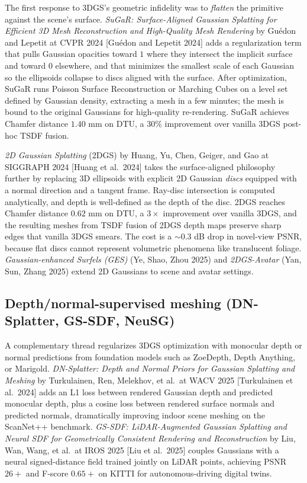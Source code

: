 The first response to 3DGS's geometric infidelity was to \emph{flatten} the primitive against the scene's surface. \emph{SuGaR: Surface-Aligned Gaussian Splatting for Efficient 3D Mesh Reconstruction and High-Quality Mesh Rendering} by Guédon and Lepetit at CVPR 2024 {[}Guédon and Lepetit 2024{]} adds a regularization term that pulls Gaussian opacities toward \(1\) where they intersect the implicit surface and toward \(0\) elsewhere, and that minimizes the smallest scale of each Gaussian so the ellipsoids collapse to discs aligned with the surface. After optimization, SuGaR runs Poisson Surface Reconstruction or Marching Cubes on a level set defined by Gaussian density, extracting a mesh in a few minutes; the mesh is bound to the original Gaussians for high-quality re-rendering. SuGaR achieves Chamfer distance \(1.40\) mm on DTU, a \(30\)\% improvement over vanilla 3DGS post-hoc TSDF fusion.

\emph{2D Gaussian Splatting} (2DGS) by Huang, Yu, Chen, Geiger, and Gao at SIGGRAPH 2024 {[}Huang et al.~2024{]} takes the surface-aligned philosophy further by replacing 3D ellipsoids with explicit 2D Gaussian \emph{discs} equipped with a normal direction and a tangent frame. Ray-disc intersection is computed analytically, and depth is well-defined as the depth of the disc. 2DGS reaches Chamfer distance \(0.62\) mm on DTU, a \(3\times\) improvement over vanilla 3DGS, and the resulting meshes from TSDF fusion of 2DGS depth maps preserve sharp edges that vanilla 3DGS smears. The cost is a \(\sim0.3\) dB drop in novel-view PSNR, because flat discs cannot represent volumetric phenomena like translucent foliage. \emph{Gaussian-enhanced Surfels (GES)} (Ye, Shao, Zhou 2025) and \emph{2DGS-Avatar} (Yan, Sun, Zhang 2025) extend 2D Gaussians to scene and avatar settings.

\subsection{Depth/normal-supervised meshing (DN-Splatter, GS-SDF, NeuSG)}\label{depthnormal-supervised-meshing-dn-splatter-gs-sdf-neusg}

A complementary thread regularizes 3DGS optimization with monocular depth or normal predictions from foundation models such as ZoeDepth, Depth Anything, or Marigold. \emph{DN-Splatter: Depth and Normal Priors for Gaussian Splatting and Meshing} by Turkulainen, Ren, Melekhov, et al.~at WACV 2025 {[}Turkulainen et al.~2024{]} adds an L1 loss between rendered Gaussian depth and predicted monocular depth, plus a cosine loss between rendered surface normals and predicted normals, dramatically improving indoor scene meshing on the ScanNet++ benchmark. \emph{GS-SDF: LiDAR-Augmented Gaussian Splatting and Neural SDF for Geometrically Consistent Rendering and Reconstruction} by Liu, Wan, Wang, et al.~at IROS 2025 {[}Liu et al.~2025{]} couples Gaussians with a neural signed-distance field trained jointly on LiDAR points, achieving PSNR \(26+\) and F-score \(0.65+\) on KITTI for autonomous-driving digital twins.

